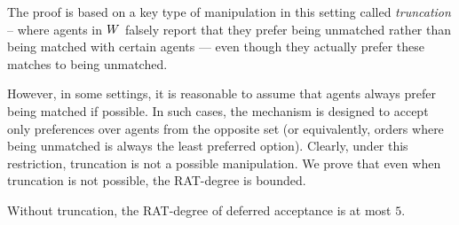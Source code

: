 The proof is based on a key type of manipulation in this setting called \emph{truncation} \cite{roth1999truncation,ehlers2008truncation,coles2014optimal} -- where agents in $W$ falsely report that they prefer being unmatched rather than being matched with certain agents — even though they actually prefer these matches to being unmatched.

However, in some settings, it is reasonable to assume that agents always prefer being matched if possible. In such cases, the mechanism is designed to accept only preferences over agents from the opposite set (or equivalently, orders where being unmatched is always the least preferred option). Clearly, under this restriction, truncation is not a possible manipulation.
We prove that even when truncation is not possible, the RAT-degree is bounded.


\begin{theoremrep}\label{prop-def-acc-no-trunc}
     Without truncation, the RAT-degree of deferred acceptance is at most $5$.
\end{theoremrep}


